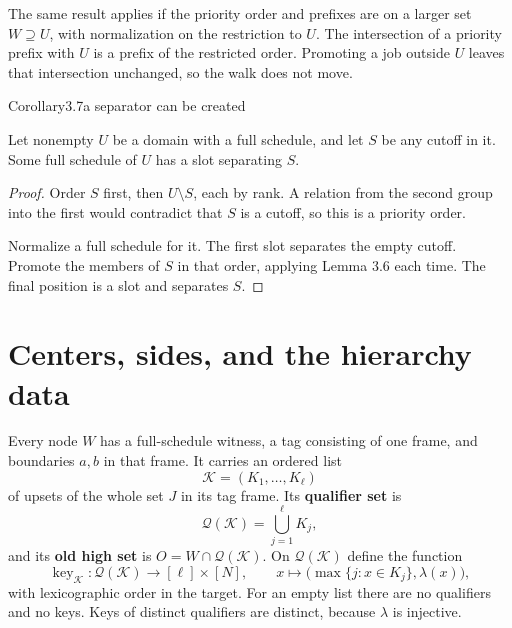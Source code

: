 The same result applies if the priority order and prefixes are on a larger set \(W\supseteq U\), with normalization on the restriction to \(U\). The intersection of a priority prefix with \(U\) is a prefix of the restricted order. Promoting a job outside \(U\) leaves that intersection unchanged, so the walk does not move.

\begin{numbered}{Corollary}{3.7}{a separator can be created}

Let nonempty \(U\) be a domain with a full schedule, and let \(S\) be any cutoff in it. Some full schedule of \(U\) has a slot separating \(S\).

\end{numbered}

\begin{proof}
Order \(S\) first, then \(U\setminus S\), each by rank. A relation from the second group into the first would contradict that \(S\) is a cutoff, so this is a priority order.

Normalize a full schedule for it. The first slot separates the empty cutoff. Promote the members of \(S\) in that order, applying Lemma 3.6 each time. The final position is a slot and separates \(S\).
\end{proof}

\section{Centers, sides, and the hierarchy data}

Every node \(W\) has a full-schedule witness, a tag consisting of one frame, and boundaries \(a,b\) in that frame. It carries an ordered list \[
\mathcal K=(K_1,\ldots,K_\ell)
\] of upsets of the whole set \(J\) in its tag frame. Its \textbf{qualifier set} is \[
\mathcal Q(\mathcal K)=\bigcup_{j=1}^{\ell}K_j,
\] and its \textbf{old high set} is \(O=W\cap\mathcal Q(\mathcal K)\). On \(\mathcal Q(\mathcal K)\) define the function \[
\operatorname{key}_{\mathcal K}:
\mathcal Q(\mathcal K)\longrightarrow[\ell]\times[N],
\qquad
x\longmapsto\bigl(\max\{j:x\in K_j\},\lambda(x)\bigr),
\tag{4.1}
\] with lexicographic order in the target. For an empty list there are no qualifiers and no keys. Keys of distinct qualifiers are distinct, because \(\lambda\) is injective.

